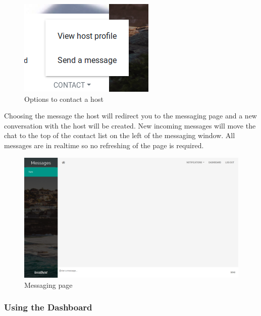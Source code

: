 \begin{figure}[!h]
  \includegraphics[width=\linewidth]{assets/userManual/contactHost.png}
  \caption{Options to contact a host}
  \label{fig:contactHost}
\end{figure}

Choosing the message the host will redirect you to the messaging page and a new
conversation with the host will be created. New incoming messages will move the
chat to the top of the contact list on the left of the messaging window. All
messages are in realtime so no refreshing of the page is required.

\begin{figure}[!h]
  \includegraphics[width=\linewidth]{assets/userManual/messages.png}
  \caption{Messaging page}
  \label{fig:messages}
\end{figure}

\subsubsection{Using the Dashboard}
